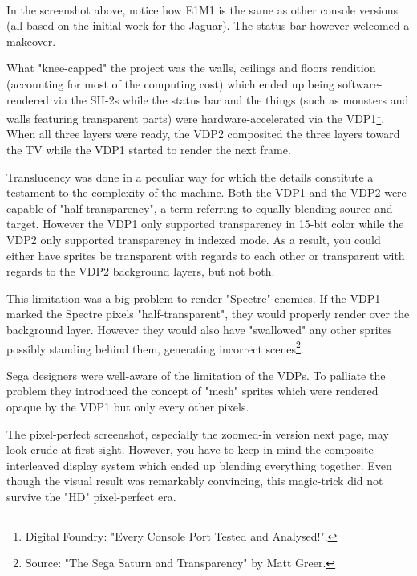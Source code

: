\\
\par
In the screenshot above, notice how E1M1 is the same as other console versions (all based on the initial work for the Jaguar). The status bar however welcomed a makeover.\\
\par
What "knee-capped" the project was the walls, ceilings and floors rendition (accounting for most of the computing cost) which ended up being software-rendered via the SH-2s while the status bar and the things (such as monsters and walls featuring transparent parts) were hardware-accelerated via the VDP1\footnote{Digital Foundry: "Every Console Port Tested and Analysed!".}. When all three layers were ready, the VDP2 composited the three layers toward the TV while the VDP1 started to render the next frame.\\
\par 
Translucency was done in a peculiar way for which the details constitute a testament to the complexity of the machine. Both the VDP1 and the VDP2 were capable of "half-transparency", a term referring to equally blending source and target. However the VDP1 only supported transparency in 15-bit color while the VDP2 only supported transparency in indexed mode. As a result, you could either have sprites be transparent with regards to each other or transparent with regards to the VDP2 background layers, but not both.\\
\par
This limitation was a big problem to render "Spectre" enemies. If the VDP1 marked the Spectre pixels "half-transparent", they would properly render over the background layer. However they would also have "swallowed" any other sprites possibly standing behind them, generating incorrect scenes\footnote{Source: "The Sega Saturn and Transparency" by Matt Greer.}.\\
\par
Sega designers were well-aware of the limitation of the VDPs. To palliate the problem they introduced the concept of "mesh" sprites which were rendered opaque by the VDP1 but only every other pixels.\\
\par
{}
\par
The pixel-perfect screenshot, especially the zoomed-in version next page, may look crude at first sight. However, you have to keep in mind the composite interleaved display system which ended up blending everything together. Even though the visual result was remarkably convincing, this magic-trick did not survive the "HD" pixel-perfect era.\\
\par
{}

